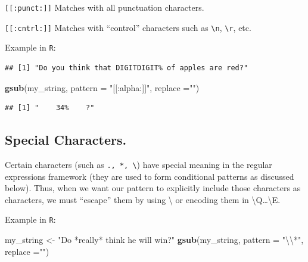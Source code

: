 \documentclass[]{book}
\newenvironment{Shaded}{\begin{snugshade}}{\end{snugshade}}
\newcommand{\KeywordTok}[1]{\textcolor[rgb]{0.13,0.29,0.53}{\textbf{#1}}}
\newcommand{\DataTypeTok}[1]{\textcolor[rgb]{0.13,0.29,0.53}{#1}}
\newcommand{\CharTok}[1]{\textcolor[rgb]{0.31,0.60,0.02}{#1}}
\newcommand{\StringTok}[1]{\textcolor[rgb]{0.31,0.60,0.02}{#1}}
\newcommand{\NormalTok}[1]{#1}
\theoremstyle{definition}
\theoremstyle{definition}
\theoremstyle{definition}
\theoremstyle{remark}
\begin{document}
\texttt{{[}{[}:punct:{]}{]}} Matches with all punctuation characters.

\texttt{{[}{[}:cntrl:{]}{]}} Matches with ``control'' characters such as
\texttt{\textbackslash{}n}, \texttt{\textbackslash{}r}, etc.

Example in \texttt{R}:

\begin{Shaded}
\end{Shaded}

\begin{verbatim}
## [1] "Do you think that DIGITDIGIT% of apples are red?"
\end{verbatim}

\begin{Shaded}
\begin{Highlighting}[]
\KeywordTok{gsub}\NormalTok{(my_string, }\DataTypeTok{pattern =} \StringTok{"[[:alpha:]]"}\NormalTok{, }\DataTypeTok{replace =}\StringTok{""}\NormalTok{)}
\end{Highlighting}
\end{Shaded}

\begin{verbatim}
## [1] "    34%    ?"
\end{verbatim}

\subsection{Special Characters.}\label{special-characters.}

Certain characters (such as \texttt{.,\ *,\ \textbackslash{}}) have
special meaning in the regular expressions framework (they are used to
form conditional patterns as discussed below). Thus, when we want our
pattern to explicitly include those characters as characters, we must
``escape'' them by using \textbackslash{} or encoding them in
\textbackslash{}Q\ldots{}\textbackslash{}E.

Example in \texttt{R}:

\begin{Shaded}
\begin{Highlighting}[]
\NormalTok{my_string <-}\StringTok{ "Do *really* think he will win?"}
\KeywordTok{gsub}\NormalTok{(my_string, }\DataTypeTok{pattern =} \StringTok{"}\CharTok{\textbackslash{}\textbackslash{}}\StringTok{*"}\NormalTok{, }\DataTypeTok{replace =}\StringTok{""}\NormalTok{)}
\end{Highlighting}
\end{Shaded}
\end{document}

